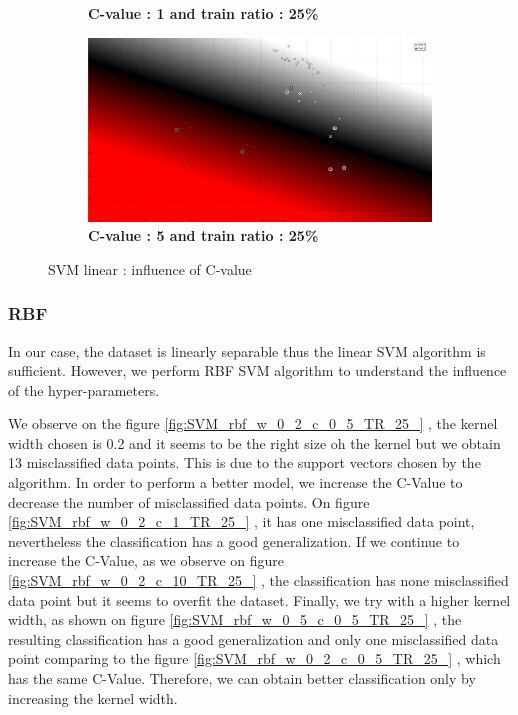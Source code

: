 \begin{figure}[ht]
\begin{subfigure}[t]{0.2\textwidth}
\caption{\bf C-value : 1 and train ratio : 25\%}
\end{subfigure}
\hfill
\begin{subfigure}[t]{0.2\textwidth}
\includegraphics[height=0.08\textheight]{./classification/SVM_linear_c_5_TR_25_.png}
\caption{\bf C-value : 5 and train ratio : 25\%}
\label{fig:SVM_linear_C_value_5}
\end{subfigure}
\caption{SVM linear : influence of C-value}
\label{fig:SVM_linear_C_value}
\end{figure}

\subsubsection{RBF}

In our case, the dataset is linearly separable thus the linear SVM algorithm is sufficient. However, we perform RBF SVM algorithm to understand the influence of the hyper-parameters.

We observe on the figure \ref{fig:SVM_rbf_w_0_2_c_0_5_TR_25_} %
, the kernel width chosen is 0.2 and it seems to be the right size oh the kernel but we obtain 13 misclassified data points. This is due to the support vectors chosen by the algorithm. In order to perform a better model, we increase the C-Value to decrease the number of misclassified data points. On figure \ref{fig:SVM_rbf_w_0_2_c_1_TR_25_}
, it has one misclassified data point, nevertheless the classification has a good generalization. If we continue to increase the C-Value, as we observe on figure \ref{fig:SVM_rbf_w_0_2_c_10_TR_25_}
, the classification has none misclassified data point but it seems to overfit the dataset.
Finally, we try with a higher kernel width, as shown on figure \ref{fig:SVM_rbf_w_0_5_c_0_5_TR_25_}
, the resulting classification has a good generalization and only one misclassified data point comparing to the figure \ref{fig:SVM_rbf_w_0_2_c_0_5_TR_25_}
, which has the same C-Value. Therefore, we can obtain better classification only by increasing the kernel width. 

